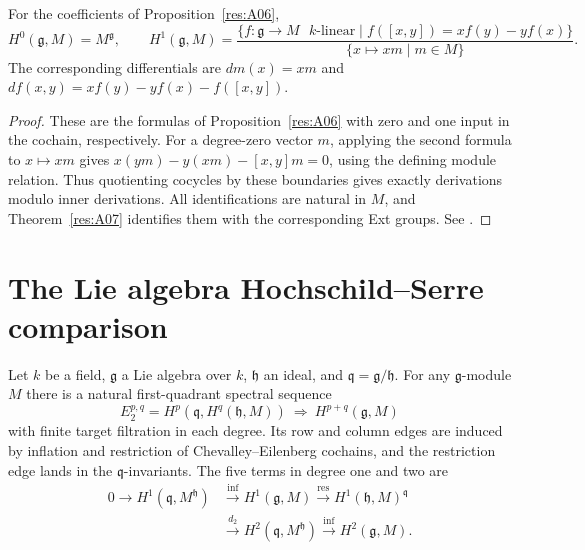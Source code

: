 \begin{corollary}\label{res:A08}
For the coefficients of Proposition~\ref{res:A06},
\[
 H^0(\mathfrak g,M)=M^{\mathfrak g},\qquad
 H^1(\mathfrak g,M)=
 \frac{\{f:\mathfrak g\to M\text{ \(k\)-linear}\mid
 f([x,y])=x f(y)-y f(x)\}}
 {\{x\mapsto x m\mid m\in M\}} .
\]
The corresponding differentials are \(dm(x)=xm\) and
\(df(x,y)=xf(y)-yf(x)-f([x,y])\).
\end{corollary}

\begin{proof}
These are the formulas of Proposition~\ref{res:A06} with zero
and one input in the cochain, respectively. For a degree-zero
vector \(m\), applying the second formula to \(x\mapsto xm\)
gives \(x(ym)-y(xm)-[x,y]m=0\), using the defining module
relation. Thus quotienting cocycles by these boundaries gives
exactly derivations modulo inner derivations. All identifications
are natural in \(M\), and Theorem~\ref{res:A07} identifies them
with the corresponding Ext groups. See
\cite[Definition 7.4.3 and Theorem 7.4.7]{weibel}.
\end{proof}

\section{The Lie algebra Hochschild--Serre comparison}

\begin{theorem}\label{res:A09}
Let \(k\) be a field, \(\mathfrak g\) a Lie algebra over \(k\),
\(\mathfrak h\) an ideal, and \(\mathfrak q=\mathfrak g/\mathfrak h\).
For any \(\mathfrak g\)-module \(M\) there is a natural first-quadrant
spectral sequence
\[
 E_2^{p,q}=H^p(\mathfrak q,H^q(\mathfrak h,M))
           \ \Longrightarrow\ H^{p+q}(\mathfrak g,M)
\]
with finite target filtration in each degree. Its row and column
edges are induced by inflation and restriction of Chevalley--Eilenberg
cochains, and the restriction edge lands in the \(\mathfrak q\)-invariants.
The five terms in degree one and two are
\begin{align*}
 0\longrightarrow H^1(\mathfrak q,M^{\mathfrak h})
 &\xrightarrow{\mathrm{inf}}H^1(\mathfrak g,M)
 \xrightarrow{\mathrm{res}}H^1(\mathfrak h,M)^{\mathfrak q}\\
 &\xrightarrow{d_2}H^2(\mathfrak q,M^{\mathfrak h})
 \xrightarrow{\mathrm{inf}}H^2(\mathfrak g,M).
\end{align*}
\end{theorem}

